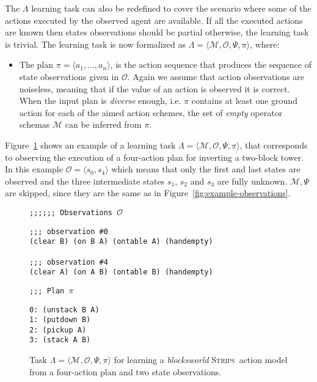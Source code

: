 \documentclass[3p,times]{elsarticle}
\newcommand{\strips}{\textsc{Strips}}     %
\newcommand{\tup}[1]{{\langle #1 \rangle}}
\begin{document}
The $\Lambda$ learning task can also be redefined to cover the scenario where some of the actions executed by the observed agent are available. If all the executed actions are known then states observations should be partial otherwise, the learning task is trivial. The learning task is now formalized as $\Lambda=\tup{\mathcal{M},\mathcal{O},\Psi,\pi}$, where:
\begin{itemize}
\item The plan $\pi=\tup{a_1, \ldots, a_n}$, is the action sequence that produces the sequence of state observations given in $\mathcal{O}$. Again we assume that action observations are noiseless, meaning that if the value of an action is observed it is correct. When the input plan is {\em diverse} enough, i.e. $\pi$ contains at least one ground action for each of the aimed action schemes, the set of {\em empty} operator schemas $\mathcal{M}$ can be inferred from $\pi$.
\end{itemize}

Figure~\ref{fig:example-plans} shows an example of a learning task $\Lambda=\tup{\mathcal{M},\mathcal{O},\Psi,\pi}$, that corresponds to observing the execution of a four-action plan for inverting a two-block tower. In this example $\mathcal{O}=\tup{s_0,s_4}$ which means that only the first and last states are observed and the three intermediate states $s_1$, $s_2$ and $s_3$ are fully unknown. $\mathcal{M},\Psi$ are skipped, since they are the same as in Figure~\ref{fig:example-observations}.  

\begin{figure}[hbt!]
{\footnotesize\tt ;;;;;; Observations $\mathcal{O}$}
\begin{footnotesize}
\begin{verbatim}
;;; observation #0
(clear B) (on B A) (ontable A) (handempty)

;;; observation #4
(clear A) (on A B) (ontable B) (handempty)
\end{verbatim}
\end{footnotesize}
  
{\footnotesize\tt ;;; Plan $\pi$}
\begin{footnotesize}
\begin{verbatim}
0: (unstack B A)
1: (putdown B)
2: (pickup A)
3: (stack A B)
\end{verbatim}
\end{footnotesize}

 \caption{\small Task $\Lambda=\tup{\mathcal{M},\mathcal{O},\Psi,\pi}$ for learning a {\em blocksworld} \strips\ action model from a four-action plan and two state observations.}
\label{fig:example-plans}
\end{figure}
\end{document}
